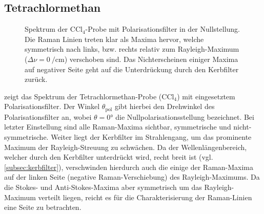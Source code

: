 \documentclass[../bericht.tex]{subfiles}
\begin{document}
      \subsection{Tetrachlormethan}
      \label{subsec:tetrachlor}

        \begin{figure}[tb]
          \caption[Spektrum der $\mathrm{CCl_4}$-Probe mit Polarisationsfilter in der Nullstellung.]{Spektrum der $\mathrm{CCl_4}$-Probe mit Polarisationsfilter in der Nullstellung. Die Raman Linien treten klar als Maxima hervor, welche symmetrisch nach links, bzw. rechts relativ zum Rayleigh-Maximum ($\Delta \nu = \SI{0}{\per\centi\meter}$) verschoben sind. Das Nichterscheinen einiger Maxima auf negativer Seite geht auf die Unterdrückung durch den Kerbfilter zurück.}
          \label{fig:ccl4}
        \end{figure}

         zeigt das Spektrum der Tetrachlormethan-Probe ($\mathrm{CCl_4}$) mit eingesetztem Polarisationsfilter. Der Winkel $\theta_\mathrm{pol}$ gibt hierbei den Drehwinkel des Polarisationsfilter an, wobei $\theta=\ang{0}$ die Nullpolarisationsstellung bezeichnet. Bei letzter Einstellung sind alle Raman-Maxima sichtbar, symmetrische und nicht-symmetrische. Weiter liegt der Kerbfilter im Strahlengang, um das prominente Maximum der Rayleigh-Streuung zu schwächen. Da der Wellenlängenbereich, welcher durch den Kerbfilter unterdrückt wird, recht breit ist (vgl. \cref{subsec:kerbfilter}), verschwinden hierdurch auch die einige der Raman-Maxima auf der linken Seite (negative Raman-Verschiebung) des Rayleigh-Maximums. Da die Stokes- und Anti-Stokes-Maxima aber symmetrisch um das Rayleigh-Maximum verteilt liegen, reicht es für die Charakterisierung der Raman-Linien eine Seite zu betrachten.
        \medskip
\end{document}
